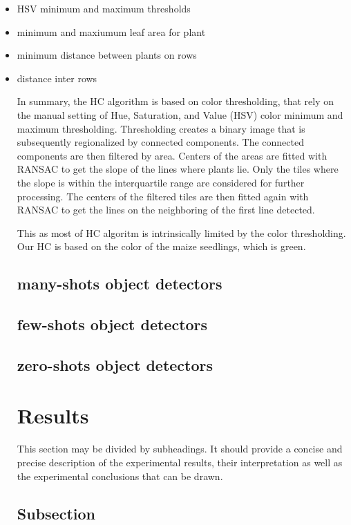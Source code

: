 \documentclass[journal,article,submit,pdftex,moreauthors]{Definitions/mdpi}
\begin{document}
\begin{itemize}
    \item HSV minimum and maximum thresholds
    \item minimum and maxiumum leaf area for plant
    \item minimum distance between plants on rows
    \item distance inter rows

In summary, the HC algorithm is based on color thresholding, that rely on the
manual setting of Hue, Saturation, and Value (HSV) color minimum and maximum
thresholding. Thresholding creates a binary image that is subsequently regionalized
by connected components. The connected components are then filtered by area.
Centers of the areas are fitted with RANSAC to get the slope of the lines where
plants lie. Only the tiles where the slope is within the interquartile range are
considered for further processing. The centers of the filtered tiles are then fitted
again with RANSAC to get the lines on the neighboring of the first line detected.

This as most of HC algoritm is intrinsically limited by the color thresholding.
Our HC is based on the color of the maize seedlings, which is green.

\subsection{many-shots object detectors}

\subsection{few-shots object detectors}

\subsection{zero-shots object detectors}

\section{Results}

This section may be divided by subheadings. It should provide a concise and precise 
description of the experimental results, their interpretation as well as the experimental 
conclusions that can be drawn.

\subsection{Subsection}

\end{itemize}
\end{document}

